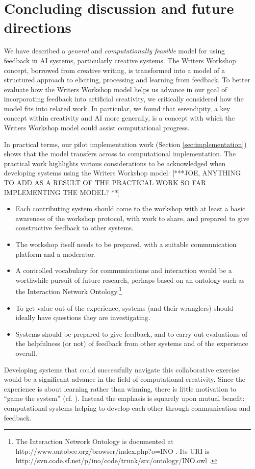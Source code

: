 \section{Concluding discussion and future directions}

 We have described a \emph{general} and \emph{computationally feasible}  
 model for using feedback in AI systems, particularly creative systems. 
 The Writers Workshop concept, borrowed from creative writing, is transformed into a model of a 
 structured approach to eliciting,  processing and learning from feedback. 
To better evaluate how the Writers Workshop model helps us
  advance in our goal of incorporating feedback into artificial
  creativity, we critically considered how the model fits into
  related work. In particular, we found that serendipity, a key concept within
  creativity and AI more generally, is a concept with which the Writers Workshop model could
  assist computational progress.

In practical terms, our pilot implementation work (Section \ref{sec:implementation}) shows that the model transfers across to computational implementation. The practical work highlights various considerations to be acknowledged when
 developing systems using the Writers Workshop model:
 [***JOE, ANYTHING TO ADD AS A RESULT OF THE PRACTICAL WORK SO FAR IMPLEMENTING THE MODEL? **]

\begin{itemize}
\item Each contributing system should come to the workshop with at
  least a basic awareness of the workshop protocol, with work to share, and
  prepared to give constructive feedback to other systems.  
  \item The
  workshop itself needs to be prepared, with a suitable communication
  platform and a moderator.  
 \item  A controlled vocabulary for communications and 
  interaction would be a worthwhile pursuit of future research, perhaps based on
  an ontology such as the Interaction Network Ontology.\footnote{The Interaction Network Ontology is documented at http://www.ontobee.org/browser/index.php?o=INO . Its URI is http://svn.code.sf.net/p/ino/code/trunk/src/ontology/INO.owl .}
  \item   To get value out of the
  experience, systems (and their wranglers) should ideally have
  questions they are investigating.  
  \item Systems should be prepared to
  give feedback, and to carry out evaluations of the helpfulness (or
  not) of feedback from other systems and of the experience overall.
  \end{itemize}
  
  Developing systems that could successfully navigate this
  collaborative exercise would be a significant advance in the field
  of computational creativity.  Since the experience is about learning
  rather than winning, there is little motivation to ``game the
  system'' (cf. ). Instead the emphasis is squarely upon 
  mutual benefit: computational systems
  helping to develop each other through communication and feedback.
